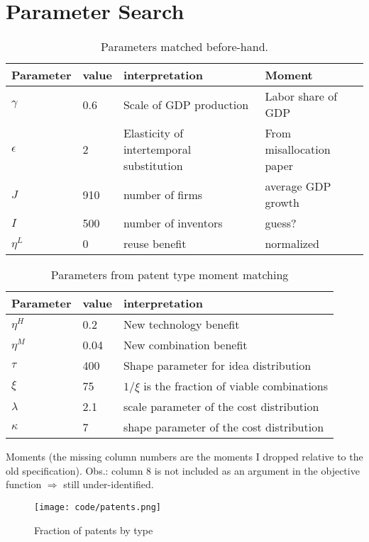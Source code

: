\documentclass[a4paper,11pt]{article}
\begin{document}
\section*{Parameter Search}


\begin{table}[h!]
\centering
\begin{tabular}{llll}
\hline \hline
Parameter & value & interpretation & Moment\\ \hline
$\gamma$ & 0.6 & Scale of GDP production & Labor share of GDP \\
$\epsilon$ & 2& Elasticity of intertemporal substitution & From misallocation paper \\
$J$ & 910 & number of firms & average GDP growth \\
$I$ & 500 & number of inventors & guess? \\
$\eta^L$& 0 & reuse benefit & normalized \\
\hline \hline
\end{tabular}
\caption{Parameters matched before-hand.}
\end{table}

\begin{table}[h!]
\centering
\begin{tabular}{lll}
\hline \hline
Parameter & value & interpretation \\ \hline
$\eta^H$ & 0.2 & New technology benefit \\
$\eta^M$ & 0.04 & New combination benefit \\
$\tau$ & 400 & Shape parameter for idea distribution \\
$\xi$ & 75 & $1/\xi$ is the fraction of viable combinations \\
$\lambda $ & 2.1 & scale parameter of the cost distribution \\
$\kappa $ & 7  & shape parameter of the cost distribution \\
\hline \hline
\end{tabular}
\caption{Parameters from patent type moment matching}
\end{table}


\begin{table}[h!]
\centering

\caption{Moments (the missing column numbers are the moments I dropped relative to the old specification). Obs.: column 8 is not included as an argument in the objective function $\Rightarrow$ still under-identified.}
\end{table}


\begin{figure}[h!]
\begin{center}
\texttt{[image: code/patents.png]}
\caption{Fraction of patents by type}
\end{center}
\end{figure}
\end{document}

